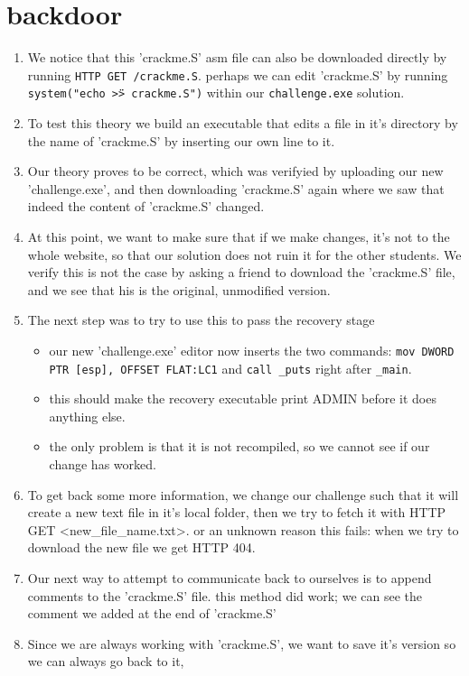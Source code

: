 \documentclass{article}
\begin{document}
\section{backdoor}
\begin{enumerate}
	\item We notice that this 'crackme.S' asm file can also be downloaded directly by running \texttt{HTTP GET /crackme.S}.
		perhaps we can edit 'crackme.S' by running \texttt{system("echo \"<asm line>\" >> crackme.S")} within our \texttt{challenge.exe} solution.
	\item To test this theory we build an executable that edits a file in it's directory by the name of 'crackme.S' by inserting our own line to it.
	\item Our theory proves to be correct, which was verifyied by uploading our new 'challenge.exe', and then downloading 'crackme.S' again
		where we saw that indeed the content of 'crackme.S' changed.
	\item At this point, we want to make sure that if we make changes, it's not to the whole website, so that our solution
		does not ruin it for the other students. We verify this is not the case by asking a friend to download the
		'crackme.S' file, and we see that his is the original, unmodified version.
	\item The next step was to try to use this to pass the recovery stage
    \begin{itemize}
		\item our new 'challenge.exe' editor now inserts the two commands: \texttt{mov	DWORD PTR [esp], OFFSET FLAT:LC1} and \texttt{call	\_puts} right after \texttt{\_main}.
		\item this should make the recovery executable print ADMIN before it does anything else.
		\item the only problem is that it is not recompiled, so we cannot see if our change has worked.
    \end{itemize}
	\item To get back some more information, we change our challenge such that it will create a new text file in it's local folder,
		then we try to fetch it with HTTP GET <new\_file\_name.txt>. or an unknown reason this fails: when we try to download the new file we get HTTP 404.
	\item Our next way to attempt to communicate back to ourselves is to append comments to the 'crackme.S' file.
        this method did work; we can see the comment we added at the end of 'crackme.S'
	\item Since we are always working with 'crackme.S', we want to save it's version so we can always go back to it,

\end{enumerate}
\end{document}
